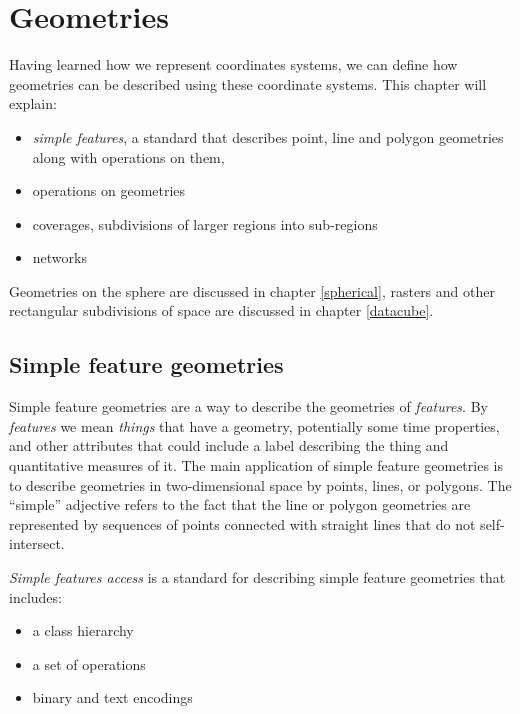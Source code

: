 \documentclass[]{book}
\providecommand{\tightlist}{%
  \setlength{\itemsep}{0pt}\setlength{\parskip}{0pt}}
\begin{document}
\hypertarget{geometries}{%
\chapter{Geometries}\label{geometries}}

Having learned how we represent coordinates systems, we can define
how geometries can be described using these coordinate systems. This
chapter will explain:

\begin{itemize}
\tightlist
\item
  \emph{simple features}, a standard that describes point, line and polygon
  geometries along with operations on them,
\item
  operations on geometries
\item
  coverages, subdivisions of larger regions into sub-regions
\item
  networks
\end{itemize}

Geometries on the sphere are discussed in chapter \ref{spherical},
rasters and other rectangular subdivisions of space are discussed
in chapter \ref{datacube}.

\hypertarget{simplefeatures}{%
\section{Simple feature geometries}\label{simplefeatures}}

Simple feature geometries are a way to describe the geometries of
\emph{features}. By \emph{features} we mean \emph{things} that have a geometry,
potentially some time properties, and other attributes that could
include a label describing the thing and quantitative measures of it.
The main application of simple feature geometries is to describe
geometries in two-dimensional space by points, lines, or polygons. The
``simple'' adjective refers to the fact that the line or polygon
geometries are represented by sequences of points connected with
straight lines that do not self-intersect.

\emph{Simple features access} is a standard \citep{sfa, sfa2, iso} for
describing simple feature geometries that includes:

\begin{itemize}
\tightlist
\item
  a class hierarchy
\item
  a set of operations
\item
  binary and text encodings
\end{itemize}
\end{document}
